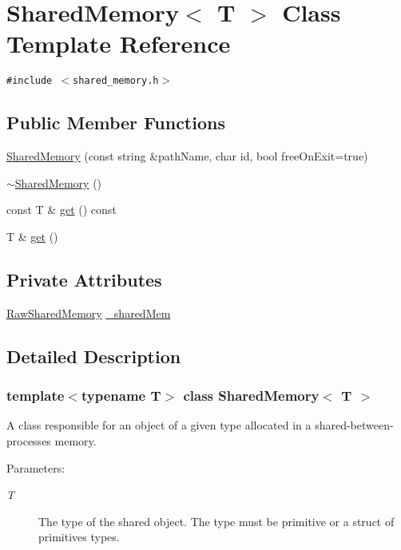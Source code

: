 \hypertarget{classSharedMemory}{
\section{SharedMemory$<$ T $>$ Class Template Reference}
\label{classSharedMemory}
}
{\tt \#include $<$shared\_\-memory.h$>$}

\subsection*{Public Member Functions}
\begin{CompactItemize}
\item 
\hyperlink{classSharedMemory_aaafab5859496d60eb465bea20274755}{SharedMemory} (const string \&pathName, char id, bool freeOnExit=true)
\item 
\hyperlink{classSharedMemory_aec1d3ed5785f82542a660556579cc32}{$\sim$SharedMemory} ()
\item 
const T \& \hyperlink{classSharedMemory_fa3899dfa26d650bbb3937c1339460f6}{get} () const 
\item 
T \& \hyperlink{classSharedMemory_9e6dc18f48d48d7a2b3513426b2c294b}{get} ()
\end{CompactItemize}
\subsection*{Private Attributes}
\begin{CompactItemize}
\item 
\hyperlink{classRawSharedMemory}{RawSharedMemory} \hyperlink{classSharedMemory_b836723ac7b0afaaf43c2bcc1b59c0d1}{\_\-sharedMem}
\end{CompactItemize}


\subsection{Detailed Description}
\subsubsection*{template$<$typename T$>$ class SharedMemory$<$ T $>$}

A class responsible for an object of a given type allocated in a shared-between-processes memory. \begin{Desc}
\item[Parameters:]
\begin{description}
\item[{\em T}]The type of the shared object. The type must be primitive or a struct of primitives types. \end{description}
\end{Desc}


